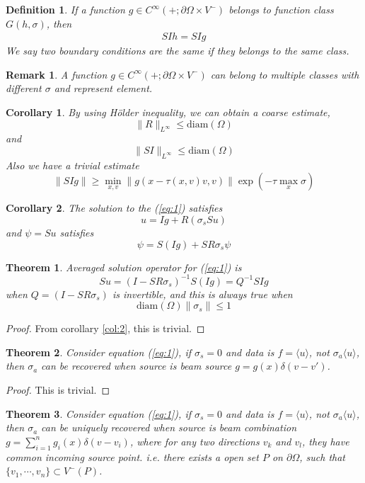 \documentclass[12pt,a4paper]{article}
\newcommand{\avg}[1]{\langle#1\rangle}
\newtheorem{Def}{Definition}
\newtheorem{Thm}{Theorem}
\newtheorem{Col}{Corollary}
\newtheorem{Rek}{Remark}
\begin{document}
\begin{Def}
If a function $g\in C^{\infty}(+;\partial\Omega\times V^{-})$ belongs to function class $G(h,\sigma)$, then
\begin{eqnarray}
SIh = SIg
\end{eqnarray}
We say two boundary conditions are the same if they belongs to the same class.
\end{Def}\label{def:4}
\begin{Rek}
A function $g\in C^{\infty}(+;\partial\Omega\times V^{-})$ can belong to multiple classes with different $\sigma$ and represent element.
\end{Rek}
\begin{Col} By using H\"{o}lder inequality, we can obtain a coarse estimate,
$$\|R\|_{L^{\infty}} \le \mathrm{diam}(\Omega)$$ 
and 
$$\|SI\|_{L^{\infty}} \le \mathrm{diam}(\Omega)$$
Also we have a trivial estimate
$$\|SIg\|\ge \min_{x,v}\|g(x-\tau(x,v)v,v)\|\exp(-\tau\max_{x}\sigma)$$
\end{Col}\label{col:1}
\begin{Col}
The solution to the (\ref{eq:1}) satisfies
$$u = Ig + R(\sigma_sSu)$$
and $\psi = Su$ satisfies
$$\psi = S(Ig) + SR\sigma_s\psi$$
\end{Col}\label{col:2}
\begin{Thm}
Averaged solution operator for (\ref{eq:1}) is
\begin{equation}
Su = (I - SR\sigma_s)^{-1}S(Ig) = Q^{-1}SIg
\end{equation}
when $Q=(I - SR\sigma_s)$ is invertible, and this is always true when $$\mathrm{diam}(\Omega)\|\sigma_s\| \le 1$$
\end{Thm}\label{thm:1}
\begin{proof}
From corollary \ref{col:2}, this is trivial.
\end{proof}\label{pr:1}
\begin{Thm}
Consider equation (\ref{eq:1}), if $\sigma_s = 0$ and data is $f= \avg{u}$, not $\sigma_a\avg{u}$, then $\sigma_a$ can be recovered when source is beam source $g =g(x)\delta(v-v')$.
\end{Thm}\label{thm:2}
\begin{proof}
This is trivial.
\end{proof}
\begin{Thm}
Consider equation (\ref{eq:1}), if $\sigma_s = 0$ and data is $f= \avg{u}$, not $\sigma_a\avg{u}$, then $\sigma_a$ can be uniquely recovered when source is beam combination $g =\sum_{i=1}^n g_i(x)\delta(v-v_i)$, where for any two directions $v_k$ and $v_l$, they have common incoming source point. i.e. there exists a open set $P$ on $\partial\Omega$, such that $\{v_1,\cdots, v_n\}\subset V^{-}(P)$.
\end{Thm}
\end{document}
